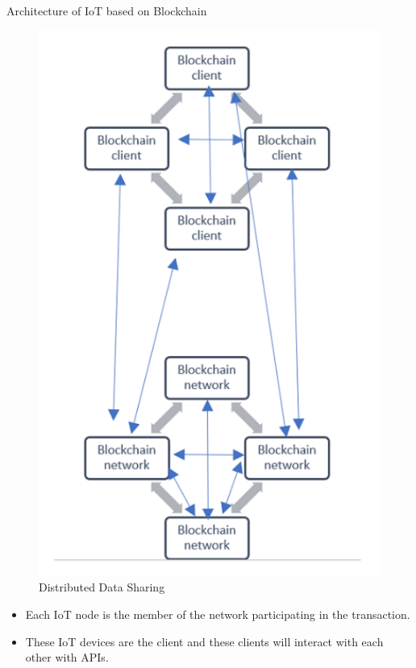 \documentclass{beamer}
\begin{document}
\begin{frame}{Architecture of IoT based on Blockchain \cite{sw_hw_sec_2021}}

\begin{minipage}{0.5\textwidth}
        \begin{figure}
            \centering
            \includegraphics[width=0.7\linewidth]{pic/distributed_data_sharing.png}
            \caption{Distributed Data Sharing}
            \label{fig:distributed-data-sharing}
        \end{figure}
\end{minipage}%
\begin{minipage}{0.5\textwidth}
    \centering
    \begin{itemize}
        \item {Each IoT node is the member of the network participating in the transaction.}
        \item {These IoT devices are the client and these clients will interact with each other with APIs.}
    \end{itemize}
\end{minipage}
\end{frame}
\end{document}
